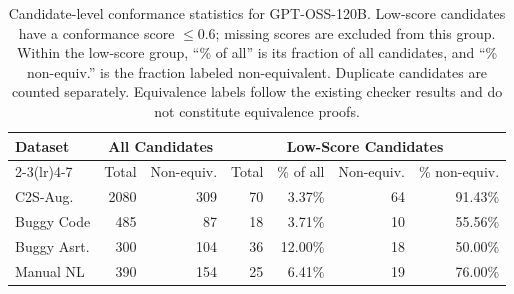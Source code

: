 \begin{table}[t]
\centering
\small
\setlength{\tabcolsep}{6pt}
\begin{tabular}{lrrrrrr}
\toprule
\textbf{Dataset} & \multicolumn{2}{c}{\textbf{All Candidates}} & \multicolumn{4}{c}{\textbf{Low-Score Candidates}} \\
\cmidrule(lr){2-3}\cmidrule(lr){4-7}
 & Total & Non-equiv. & Total & \% of all & Non-equiv. & \% non-equiv. \\
\midrule
C2S-Aug. & 2080 & 309 & 70 & 3.37\% & 64 & 91.43\% \\
Buggy Code & 485 & 87 & 18 & 3.71\% & 10 & 55.56\% \\
Buggy Asrt. & 300 & 104 & 36 & 12.00\% & 18 & 50.00\% \\
Manual NL & 390 & 154 & 25 & 6.41\% & 19 & 76.00\% \\
\bottomrule
\end{tabular}
\caption{Candidate-level conformance statistics for GPT-OSS-120B. Low-score candidates have a conformance score $\leq 0.6$; missing scores are excluded from this group. Within the low-score group, ``\% of all'' is its fraction of all candidates, and ``\% non-equiv.'' is the fraction labeled non-equivalent. Duplicate candidates are counted separately. Equivalence labels follow the existing checker results and do not constitute equivalence proofs.}
\label{tab:conformance-low-score-summary}
\end{table}
